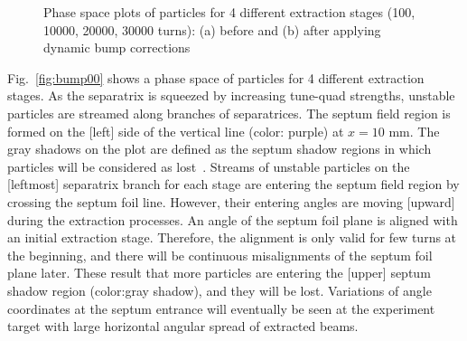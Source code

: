 \documentclass[aps,prstab,onecolumn,preprint,endfloats,11pt]{revtex4-1}
\begin{document}
\begin{figure}[!tbp]
  \caption{\label{fig:bump0}Phase space plots of particles for 4 different extraction stages (100, 10000, 20000, 30000 turns): (a) before and (b) after applying dynamic bump corrections}
\end{figure}

Fig.~\ref{fig:bump00} shows a phase space of particles for 4 different extraction stages.
As the separatrix is squeezed by increasing tune-quad strengths, unstable particles are streamed along branches of separatrices. 
The septum field region is formed on the [left] side of the vertical line (color: purple) at $x=10$ mm. 
The gray shadows on the plot are defined as the septum shadow regions in which particles will be considered as lost~\cite{m.pullia}.
Streams of unstable particles on the [leftmost] separatrix branch for each stage are entering the septum field region by crossing the septum foil line.
However, their entering angles are moving [upward] during the extraction processes.
An angle of the septum foil plane is aligned with an initial extraction stage.
Therefore, the alignment is only valid for few turns at the beginning, and there will be continuous misalignments of the septum foil plane later.
These result that more particles are entering the [upper] septum shadow region (color:gray shadow), and they will be lost.
Variations of angle coordinates at the septum entrance will eventually be seen at the experiment target with large horizontal angular spread of extracted beams.
\end{document}
